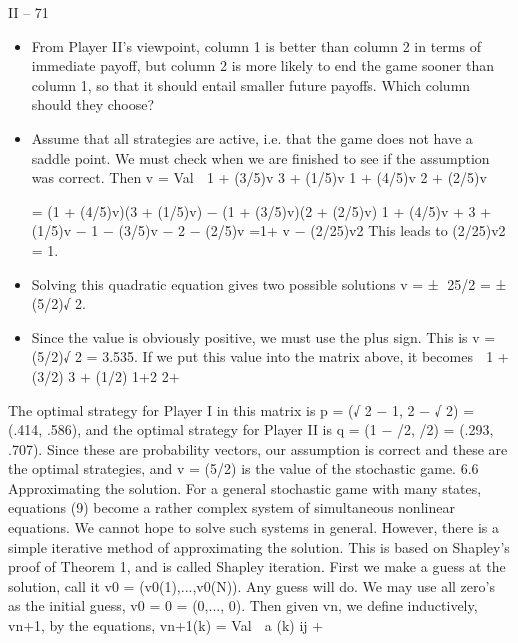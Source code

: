 \documentclass[]{report}
\begin{document}
II – 71
\begin{itemize}
\item From Player II’s viewpoint, column 1 is better than column 2 in terms of immediate payoff,
but column 2 is more likely to end the game sooner than column 1, so that it should entail
smaller future payoffs. Which column should they choose?
\item Assume that all strategies are active, i.e. that the game does not have a saddle point.
We must check when we are finished to see if the assumption was correct. Then
v = Val  1 + (3/5)v 3 + (1/5)v
1 + (4/5)v 2 + (2/5)v

= (1 + (4/5)v)(3 + (1/5)v) − (1 + (3/5)v)(2 + (2/5)v)
1 + (4/5)v + 3 + (1/5)v − 1 − (3/5)v − 2 − (2/5)v
=1+ v − (2/25)v2
This leads to
(2/25)v2 = 1.
\item Solving this quadratic equation gives two possible solutions v = ±
25/2 = ±(5/2)√
2.
\item 
Since the value is obviously positive, we must use the plus sign. This is v = (5/2)√
2 =
3.535. If we put this value into the matrix above, it becomes
 1 + (3/2) 3 + (1/2)
1+2 2+ 
\end{itemize}
The optimal strategy for Player I in this matrix is p = (√
2 − 1, 2 − √
2) = (.414, .586),
and the optimal strategy for Player II is q = (1 − /2,
/2) = (.293, .707). Since these
are probability vectors, our assumption is correct and these are the optimal strategies, and
v = (5/2) is the value of the stochastic game.
6.6 Approximating the solution. For a general stochastic game with many states,
equations (9) become a rather complex system of simultaneous nonlinear equations. We
cannot hope to solve such systems in general. However, there is a simple iterative method
of approximating the solution. This is based on Shapley’s proof of Theorem 1, and is called
Shapley iteration.
First we make a guess at the solution, call it v0 = (v0(1),...,v0(N)). Any guess will
do. We may use all zero’s as the initial guess, v0 = 0 = (0,..., 0). Then given vn, we
define inductively, vn+1, by the equations,
vn+1(k) = Val 
a
(k)
ij +
\end{document}
